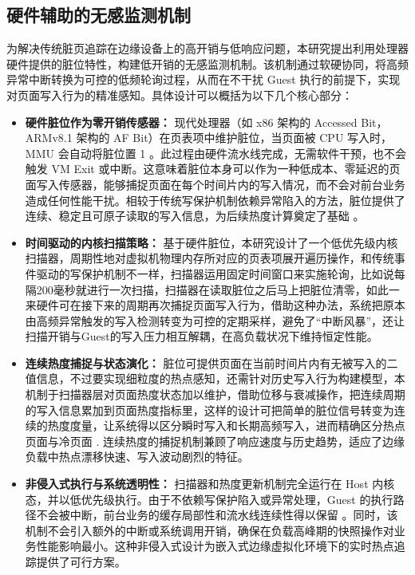 \subsection{硬件辅助的无感监测机制}

为解决传统脏页追踪在边缘设备上的高开销与低响应问题，本研究提出利用处理器硬件提供的脏位特性，构建低开销的无感监测机制。该机制通过软硬协同，将高频异常中断转换为可控的低频轮询过程，从而在不干扰 Guest 执行的前提下，实现对页面写入行为的精准感知。具体设计可以概括为以下几个核心部分：

\begin{itemize}

\item \textbf{硬件脏位作为零开销传感器：}
现代处理器（如 x86 架构的 Accessed Bit，ARMv8.1 架构的 AF Bit）在页表项中维护脏位，当页面被 CPU 写入时，MMU 会自动将脏位置 1 \cite{arm2017v8, intel2015manual}。此过程由硬件流水线完成，无需软件干预，也不会触发 VM Exit 或中断。这意味着脏位本身可以作为一种低成本、零延迟的页面写入传感器，能够捕捉页面在每个时间片内的写入情况，而不会对前台业务造成任何性能干扰。相较于传统写保护机制依赖异常陷入的方法，脏位提供了连续、稳定且可原子读取的写入信息，为后续热度计算奠定了基础 \cite{zhong2016flic}。

\item \textbf{时间驱动的内核扫描策略：}
基于硬件脏位，本研究设计了一个低优先级内核扫描器，周期性地对虚拟机物理内存所对应的页表项展开遍历操作，和传统事件驱动的写保护机制不一样，扫描器运用固定时间窗口来实施轮询，比如说每隔200毫秒就进行一次扫描\cite{liu2011performance}，扫描器在读取脏位之后马上把脏位清零，如此一来硬件可在接下来的周期再次捕捉页面写入行为，借助这种办法，系统把原本由高频异常触发的写入检测转变为可控的定期采样，避免了“中断风暴”，还让扫描开销与Guest的写入压力相互解耦，在高负载状况下维持恒定性能。

\item \textbf{连续热度捕捉与状态演化：}
脏位可提供页面在当前时间片内有无被写入的二值信息，不过要实现细粒度的热点感知，还需针对历史写入行为构建模型，本机制于扫描器层对页面热度状态加以维护，借助位移与衰减操作，把连续周期的写入信息累加到页面热度指标里，这样的设计可把简单的脏位信号转变为连续的热度度量，让系统得以区分瞬时写入和长期高频写入，进而精确区分热点页面与冷页面 \cite{xu2015vmexit}. 连续热度的捕捉机制兼顾了响应速度与历史趋势，适应了边缘负载中热点漂移快速、写入波动剧烈的特征。

\item \textbf{非侵入式执行与系统透明性：}
扫描器和热度更新机制完全运行在 Host 内核态，并以低优先级执行。由于不依赖写保护陷入或异常处理，Guest 的执行路径不会被中断，前台业务的缓存局部性和流水线连续性得以保留 \cite{liu2011performance}。同时，该机制不会引入额外的中断或系统调用开销，确保在负载高峰期的快照操作对业务性能影响最小。这种非侵入式设计为嵌入式边缘虚拟化环境下的实时热点追踪提供了可行方案。


\end{itemize}
